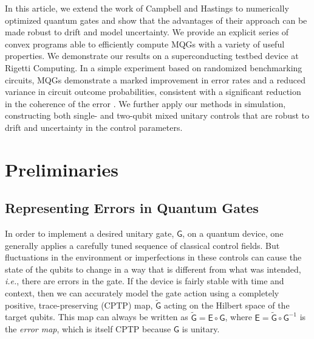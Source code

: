 \documentclass[aps,nofootinbib,pra,notitlepage,twocolumn]{revtex4-1}
\newcommand{\actual}{\ensuremath{\tilde{\mathsf{G}}}}
\newcommand{\target}{\ensuremath{{\mathsf{G}}}}
\newcommand{\error}{\ensuremath{{\mathsf{E}}}}
\newcommand{\0}{\ensuremath{\mathbf{0}}}
\begin{document}
In this article, we extend the work of Campbell and Hastings to numerically optimized quantum gates and show that the advantages of their approach can be made robust to drift and model uncertainty. We provide an explicit series of convex programs able to efficiently compute MQGs with a variety of useful properties. We demonstrate our results on a superconducting testbed device at Rigetti Computing.  In a simple experiment based on randomized benchmarking circuits, MQGs demonstrate a marked improvement in error rates and a reduced variance in circuit outcome probabilities, consistent with a significant reduction in the coherence of the error \cite{Ball2016}. We further apply our methods in simulation, constructing both single- and two-qubit mixed unitary controls that are robust to drift and uncertainty in the control parameters.


\section{Preliminaries}
\label{sec:preliminaries}

\subsection{Representing Errors in Quantum Gates}
\label{sec:rep_errors}
\noindent In order to implement a desired unitary gate, $\target$, on a quantum device, one generally applies a carefully tuned sequence of classical control fields.  But fluctuations in the environment or imperfections in these controls can cause the state of the qubits to change in a way that is different from what was intended, \emph{i.e.}, there are errors in the gate. If the device is fairly stable with time\cite{1907.13608} and context\cite{Rudinger2019}, then we can accurately model the gate action using a completely positive, trace-preserving (CPTP) map, $\actual$ acting on the Hilbert space of the target qubits. This map can always be written as $\actual = \error\circ\target$, where $\error = \actual\circ\target^{-1}$ is the \emph{error map}, which is itself CPTP because $\target$ is unitary.
\end{document}
